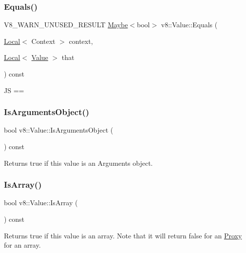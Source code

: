 \subsubsection{\texorpdfstring{Equals()}{Equals()}}
{\footnotesize\ttfamily V8\+\_\+\+W\+A\+R\+N\+\_\+\+U\+N\+U\+S\+E\+D\+\_\+\+R\+E\+S\+U\+LT \mbox{\hyperlink{classv8_1_1Maybe}{Maybe}}$<$bool$>$ v8\+::\+Value\+::\+Equals (\begin{DoxyParamCaption}\item[{\mbox{\hyperlink{classv8_1_1Local}{Local}}$<$ Context $>$}]{context,  }\item[{\mbox{\hyperlink{classv8_1_1Local}{Local}}$<$ \mbox{\hyperlink{classv8_1_1Value}{Value}} $>$}]{that }\end{DoxyParamCaption}) const}

JS == \mbox{\label{classv8_1_1Value_addd71e0247ca7e8055dafdf196542b0b}} 
\subsubsection{\texorpdfstring{Is\+Arguments\+Object()}{IsArgumentsObject()}}
{\footnotesize\ttfamily bool v8\+::\+Value\+::\+Is\+Arguments\+Object (\begin{DoxyParamCaption}{ }\end{DoxyParamCaption}) const}

Returns true if this value is an Arguments object. \mbox{\label{classv8_1_1Value_a4908fac2c2888ade5d05a8dd312e1fd7}} 
\subsubsection{\texorpdfstring{Is\+Array()}{IsArray()}}
{\footnotesize\ttfamily bool v8\+::\+Value\+::\+Is\+Array (\begin{DoxyParamCaption}{ }\end{DoxyParamCaption}) const}

Returns true if this value is an array. Note that it will return false for an \mbox{\hyperlink{classv8_1_1Proxy}{Proxy}} for an array. \mbox{\label{classv8_1_1Value_a62c732277023d09f5e5a54eaa2846853}} 

